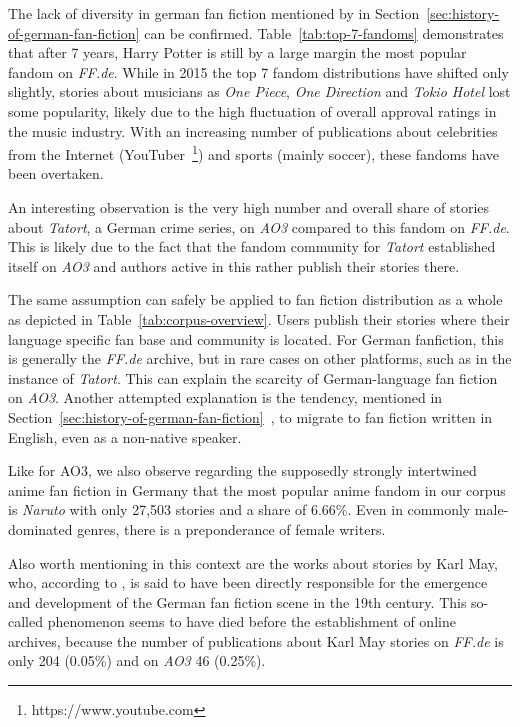 The lack of diversity in german fan fiction mentioned by \citet{Cuntz-Leng2015AGermany} in Section~\ref{sec:history-of-german-fan-fiction} can be confirmed.
Table~\ref{tab:top-7-fandoms} demonstrates that after 7 years, Harry Potter is still by a large margin the most popular fandom on \emph{FF.de}.
While in 2015 the top 7 fandom distributions have shifted only slightly, stories about musicians as \emph{One Piece}, \emph{One Direction} and \emph{Tokio Hotel} lost some popularity, likely due to the high fluctuation of overall approval ratings in the music industry.
With an increasing number of publications about celebrities from the Internet (YouTuber~\footnote{https://www.youtube.com}) and sports (mainly soccer), these fandoms have been overtaken.

An interesting observation is the very high number and overall share of stories about \emph{Tatort}, a German crime series, on \emph{AO3} compared to this fandom on \emph{FF.de}.
This is likely due to the fact that the fandom community for \emph{Tatort} established itself on \emph{AO3} and authors active in this rather publish their stories there.

The same assumption can safely be applied to fan fiction distribution as a whole as depicted in Table~\ref{tab:corpus-overview}.
Users publish their stories where their language specific fan base and community is located.
For German fanfiction, this is generally the \emph{FF.de} archive, but in rare cases on other platforms, such as in the instance of \emph{Tatort}.
This can explain the scarcity of German-language fan fiction on \emph{AO3}.
Another attempted explanation is the tendency, mentioned in Section~\ref{sec:history-of-german-fan-fiction}~\citep{Cuntz-Leng2015AGermany}, to migrate to fan fiction written in English, even as a non-native speaker.

Like \citet{Schmidt2021TowardsOwn} for AO3, we also observe regarding the supposedly strongly intertwined anime fan fiction in Germany that the most popular anime fandom in our corpus is \emph{Naruto} with only 27,503 stories and a share of 6.66\%.
Even in commonly male-dominated genres, there is a preponderance of female writers.

Also worth mentioning in this context are the works about stories by Karl May, who, according to \citet{Cuntz-Leng2015AGermany}, is said to have been directly responsible for the emergence and development of the German fan fiction scene in the 19th century.
This so-called phenomenon seems to have died before the establishment of online archives, because the number of publications about Karl May stories on \emph{FF.de} is only 204 (0.05\%) and on \emph{AO3} 46 (0.25\%).

